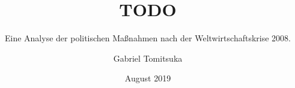 \documentclass[a4paper,draft]{report}
\begin{document}
\title{TODO}
\subtitle{Eine Analyse der politischen Maßnahmen nach der Weltwirtschaftskrise 2008.}
\author{Gabriel Tomitsuka}
\date{August 2019}
\maketitle
\end{document}
